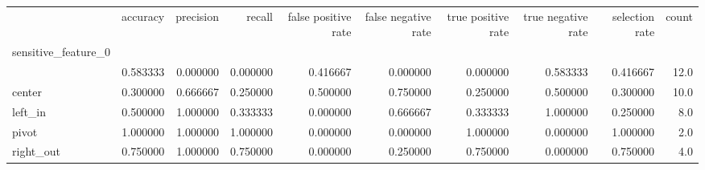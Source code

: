 \begin{tabular}{lrrrrrrrrr}
\toprule
{} &  accuracy &  precision &    recall &  false positive rate &  false negative rate &  true positive rate &  true negative rate &  selection rate &  count \\
sensitive\_feature\_0 &           &            &           &                      &                      &                     &                     &                 &        \\
\midrule
                    &  0.583333 &   0.000000 &  0.000000 &             0.416667 &             0.000000 &            0.000000 &            0.583333 &        0.416667 &   12.0 \\
center              &  0.300000 &   0.666667 &  0.250000 &             0.500000 &             0.750000 &            0.250000 &            0.500000 &        0.300000 &   10.0 \\
left\_in             &  0.500000 &   1.000000 &  0.333333 &             0.000000 &             0.666667 &            0.333333 &            1.000000 &        0.250000 &    8.0 \\
pivot               &  1.000000 &   1.000000 &  1.000000 &             0.000000 &             0.000000 &            1.000000 &            0.000000 &        1.000000 &    2.0 \\
right\_out           &  0.750000 &   1.000000 &  0.750000 &             0.000000 &             0.250000 &            0.750000 &            0.000000 &        0.750000 &    4.0 \\
\bottomrule
\end{tabular}

